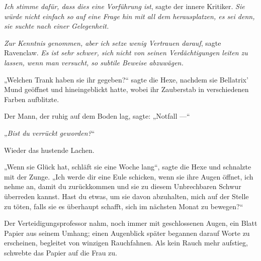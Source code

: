 \emph{Ich stimme dafür, dass dies eine Vorführung ist}, sagte der innere Kritiker. \emph{Sie würde nicht einfach so auf eine Frage hin mit all dem herausplatzen, es sei denn, sie suchte nach einer Gelegenheit.}

\emph{Zur Kenntnis genommen, aber ich setze wenig Vertrauen darauf}, sagte Ravenclaw. \emph{Es ist sehr schwer, sich nicht von seinen Verdächtigungen leiten zu lassen, wenn man versucht, so subtile Beweise abzuwägen.}

„Welchen Trank haben sie ihr gegeben?“ sagte die Hexe, nachdem sie Bellatrix’ Mund geöffnet und hineingeblickt hatte, wobei ihr Zauberstab in verschiedenen Farben aufblitzte.

Der Mann, der ruhig auf dem Boden lag, sagte:
„Notfall —“

„\emph{Bist du verrückt geworden?}“

Wieder das hustende Lachen.

„Wenn sie Glück hat, schläft sie eine Woche lang“, sagte die Hexe und schnalzte mit der Zunge.
„Ich werde dir eine Eule schicken, wenn sie ihre Augen öffnet, ich nehme an, damit du zurückkommen und sie zu diesem Unbrechbaren Schwur überreden kannst. Hast du etwas, um sie davon abzuhalten, mich auf der Stelle zu töten, falls sie es überhaupt schafft, sich im nächsten Monat zu bewegen?“

Der Verteidigungsprofessor nahm, noch immer mit geschlossenen Augen, ein Blatt Papier aus seinem Umhang; einen Augenblick später begannen darauf Worte zu erscheinen, begleitet von winzigen Rauchfahnen. Als kein Rauch mehr aufstieg, schwebte das Papier auf die Frau zu.

